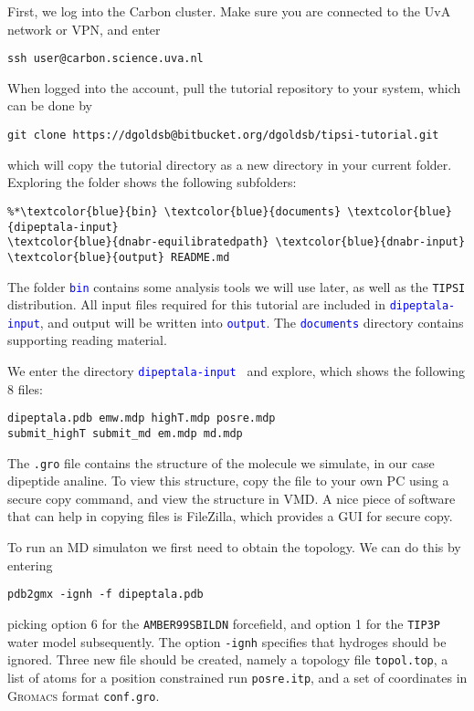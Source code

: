 \documentclass[]{article}
\begin{document}
First, we log into the Carbon cluster. Make sure you are connected to the UvA network or VPN, and enter
%
\begin{lstlisting}
ssh user@carbon.science.uva.nl
\end{lstlisting}
%
When logged into the account, pull the tutorial repository to your system, which can be done by
%
\begin{lstlisting}
git clone https://dgoldsb@bitbucket.org/dgoldsb/tipsi-tutorial.git
\end{lstlisting}
%
which will copy the tutorial directory as a new directory in your current folder. Exploring the folder shows the following subfolders:
%
\begin{lstlisting}
%*\textcolor{blue}{bin} \textcolor{blue}{documents} \textcolor{blue}{dipeptala-input} 
\textcolor{blue}{dnabr-equilibratedpath} \textcolor{blue}{dnabr-input} \textcolor{blue}{output} README.md
\end{lstlisting}
%
The folder \texttt{\textcolor{blue}{bin}} contains some analysis tools we will use later, as well as the \texttt{TIPSI} distribution. All input files required for this tutorial are included in \texttt{\textcolor{blue}{dipeptala-input}}, and output will be written into \texttt{\textcolor{blue}{output}}. The \texttt{\textcolor{blue}{documents}} directory contains supporting reading material.

We enter the directory \texttt{\textcolor{blue}{dipeptala-input} } and explore, which shows the following 8 files:
%
\begin{lstlisting}
dipeptala.pdb emw.mdp highT.mdp posre.mdp 
submit_highT submit_md em.mdp md.mdp
\end{lstlisting}
%
The \texttt{.gro} file contains the structure of the molecule we simulate, in our case dipeptide analine. To view this structure, copy the file to your own PC using a secure copy command, and view the structure in VMD. A nice piece of software that can help in copying files is FileZilla, which provides a GUI for secure copy.

To run an MD simulaton we first need to obtain the topology. We can do this by entering
%
\begin{lstlisting}
pdb2gmx -ignh -f dipeptala.pdb
\end{lstlisting}
%
picking option 6 for the \texttt{AMBER99SBILDN} forcefield, and option 1 for the \texttt{TIP3P} water model subsequently. The option \texttt{-ignh} specifies that hydroges should be ignored. Three new file should be created, namely a topology file \texttt{topol.top}, a list of atoms for a position constrained run \texttt{posre.itp}, and a set of coordinates in \textsc{Gromacs} format \texttt{conf.gro}. 
\end{document}
